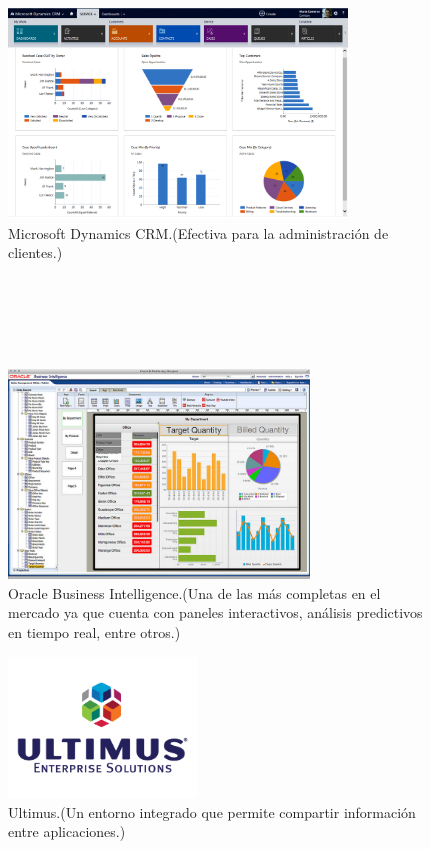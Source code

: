 \documentclass[a4paper,12pt,twocolumn]{article}
\begin{document}
\begin{figure}[h!]
\centering
\includegraphics[width=9cm]{./Imagenes/BIimagen2}
\caption{\label{fig:01}Microsoft Dynamics CRM.(Efectiva para la administración de clientes.)}
\end{figure}
\textbf{}\\
\textbf{}\\
\textbf{}\\
\textbf{}\\
\begin{figure}[h!]
\centering
\includegraphics[width=8cm]{./Imagenes/BIimagen3}
\caption{\label{fig:01}Oracle Business Intelligence.(Una de las más completas en el mercado ya que cuenta con paneles interactivos, análisis predictivos en tiempo real, entre otros.)}
\end{figure}

\begin{figure}[h!]
\centering
\includegraphics[width=5cm]{./Imagenes/BIimagen4}
\caption{\label{fig:01}Ultimus.(Un entorno integrado que permite compartir información entre aplicaciones.)}
\end{figure}
\end{document}
